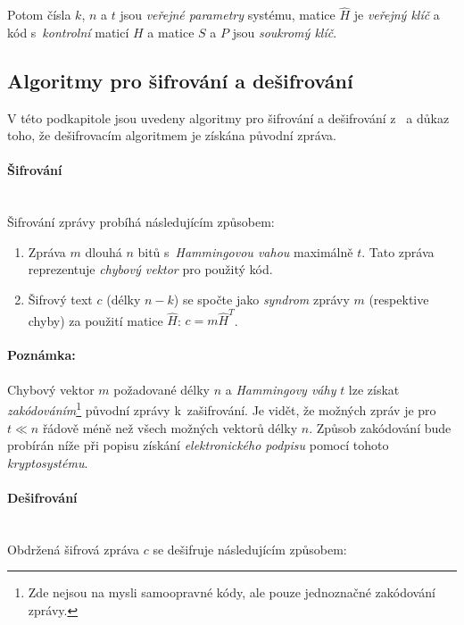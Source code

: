 \documentclass[thesis=M,czech,hidelinks]{FITthesis}[2012/06/26]
\newcommand{\0}{{\textcolor[gray]{0.80}{0}}}
\begin{document}
Potom čísla $k$, $n$ a $t$ jsou \emph{veřejné parametry} systému, matice
$\hat{H}$ je \emph{veřejný klíč} a kód s~\emph{kontrolní} maticí $H$ a matice
$S$ a $P$ jsou \emph{soukromý klíč}.


\subsection{Algoritmy pro šifrování a dešifrování}

V této podkapitole jsou uvedeny algoritmy pro šifrování a dešifrování
z~\cite{Niederreiter} a důkaz toho, že dešifrovacím algoritmem je získána
původní zpráva.

\paragraph{Šifrování} \hfill \\

Šifrování zprávy probíhá následujícím způsobem:

\begin{enumerate}
    \item Zpráva $m$ dlouhá $n$ bitů s~\emph{Hammingovou vahou} maximálně $t$.
        Tato zpráva reprezentuje \emph{chybový vektor} pro použitý kód.
    \item Šifrový text $c$ (délky $n-k$) se spočte jako \emph{syndrom} zprávy
        $m$ (respektive chyby) za použití matice $\hat{H}$: $c = m \hat{H}^T$.
\end{enumerate}

\paragraph{Poznámka:} Chybový vektor $m$ požadované délky $n$ a \emph{Hammingovy
váhy} $t$ lze získat \emph{zakódováním}\footnote{
    Zde nejsou na mysli samoopravné kódy, ale pouze jednoznačné zakódování
    zprávy.
} původní zprávy k~zašifrování. Je vidět, že možných zpráv je pro $t \ll n$
řádově méně než všech možných vektorů délky $n$. Způsob zakódování bude probírán
níže při popisu získání \emph{elektronického podpisu} pomocí tohoto
\emph{kryptosystému}.



\paragraph{Dešifrování} \hfill \\
Obdržená šifrová zpráva $c$ se dešifruje následujícím způsobem:
\end{document}

